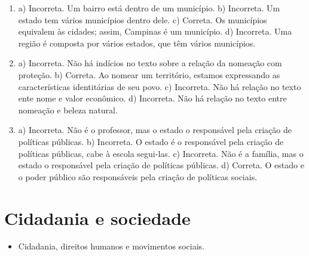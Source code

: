 
\begin{enumerate}

\item
a) Incorreta. Um bairro está dentro de um município.
b) Incorreta. Um estado tem vários municípios dentro dele.
c) Correta. Os municípios equivalem às cidades; assim, Campinas é um
município.
d) Incorreta. Uma região é composta por vários estados, que têm vários
municípios.

\item
a) Incorreta. Não há indícios no texto sobre a relação da nomeação com
proteção.
b) Correta. Ao nomear um território, estamos expressando as
características identitárias de seu povo.
c) Incorreta. Não há relação no texto ente nome e valor econômico.
d) Incorreta. Não há relação no texto entre nomeação e beleza natural.

\item
a) Incorreta. Não é o professor, mas o estado o responsável pela criação
de políticas públicas.
b) Incorreta. O estado é o responsável pela criação de políticas
públicas, cabe à escola segui-las.
c) Incorreta. Não é a família, mas o estado o responsável pela criação
de políticas públicas.
d) Correta. O estado e o poder público são responsáveis pela criação de
políticas sociais.
\end{enumerate}


\chapter{Cidadania e sociedade}



\begin{itemize}
\item Cidadania, direitos humanos e movimentos sociais.
\end{itemize}

